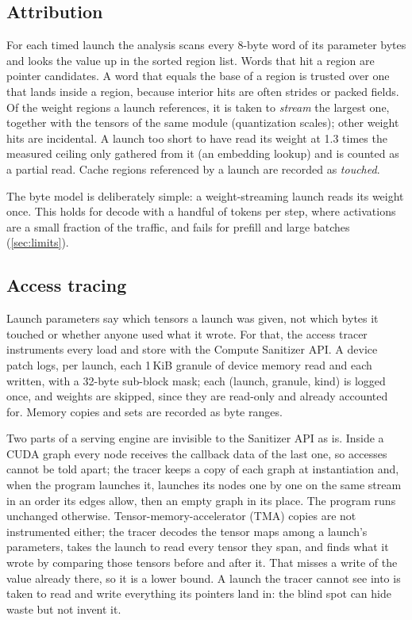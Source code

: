 \subsection{Attribution}\label{sec:attribution}

For each timed launch the analysis scans every 8-byte word of its parameter bytes and looks the
value up in the sorted region list. Words that hit a region are pointer candidates. A word that
equals the base of a region is trusted over one that lands inside a region, because interior hits
are often strides or packed fields. Of the weight regions a launch references, it is taken to
\emph{stream} the largest one, together with the tensors of the same module (quantization scales);
other weight hits are incidental. A launch too short to have read its weight at 1.3 times the
measured ceiling only gathered from it (an embedding lookup) and is counted as a partial read.
Cache regions referenced by a launch are recorded as \emph{touched}.

The byte model is deliberately simple: a weight-streaming launch reads its weight once. This holds
for decode with a handful of tokens per step, where activations are a small fraction of the
traffic, and fails for prefill and large batches (\cref{sec:limits}).

\subsection{Access tracing}\label{sec:access}

Launch parameters say which tensors a launch was given, not which bytes it touched or whether
anyone used what it wrote. For that, the access tracer instruments every load and store with the
Compute Sanitizer API. A device patch logs, per launch, each 1\,KiB granule of device memory read
and each written, with a 32-byte sub-block mask; each (launch, granule, kind) is logged once, and
weights are skipped, since they are read-only and already accounted for. Memory copies and sets
are recorded as byte ranges.

Two parts of a serving engine are invisible to the Sanitizer API as is. Inside a CUDA graph every
node receives the callback data of the last one, so accesses cannot be told apart; the tracer keeps
a copy of each graph at instantiation and, when the program launches it, launches its nodes one by
one on the same stream in an order its edges allow, then an empty graph in its place. The program
runs unchanged otherwise. Tensor-memory-accelerator (TMA) copies are not instrumented either; the
tracer decodes the tensor maps among a launch's parameters, takes the launch to read every tensor
they span, and finds what it wrote by comparing those tensors before and after it. That misses a
write of the value already there, so it is a lower bound. A launch the tracer cannot see into is
taken to read and write everything its pointers land in: the blind spot can hide waste but not
invent it.

